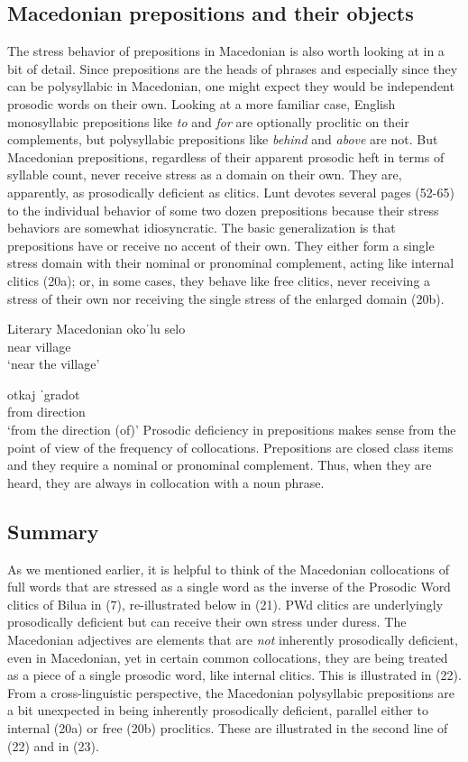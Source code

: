 \documentclass[output=paper,
modfonts
]{LSP/langsci}
\begin{document}
\subsection[Macedonian prepositions and their objects]{Macedonian prepositions and their objects}

The stress behavior of prepositions in Macedonian is also worth looking at in a bit of detail. Since prepositions are the heads of phrases and especially since they can be polysyllabic in Macedonian, one might expect they would be independent prosodic words on their own. Looking at a more familiar case, English monosyllabic prepositions like \textit{to} and\textit{ for} are optionally proclitic on their complements, but polysyllabic prepositions like \textit{behind} and \textit{above} are not. But Macedonian prepositions, regardless of their apparent prosodic heft in terms of syllable count, never receive stress as a domain on their own. They are, apparently, as prosodically deficient as clitics. Lunt devotes several pages (52-65) to the individual behavior of some two dozen prepositions because their stress behaviors are somewhat idiosyncratic. The basic generalization is that prepositions have or receive no accent of their own. They either form a single stress domain with their nominal or pronominal complement, acting like internal clitics (20a); or, in some cases, they behave like free clitics, never receiving a stress of their own nor receiving the single stress of the enlarged domain (20b). 

\ea Literary Macedonian \citep{franks1989}
	\ea \gll okoˈlu selo\\
	near village\\
	\glt  `near the village'

	\ex otkaj ˈgradot\\
	from direction\\
	\glt `from the direction (of)'
	\z
\z
Prosodic deficiency in prepositions makes sense from the point of view of the frequency of collocations. Prepositions are closed class items and they require a nominal or pronominal complement. Thus, when they are heard, they are always in collocation with a noun phrase.

\subsection[Summary]{Summary}

As we mentioned earlier, it is helpful to think of the Macedonian collocations of full words that are stressed as a single word as the inverse of the Prosodic Word clitics of Bilua in (7), re-illustrated below in (21). PWd clitics are underlyingly prosodically deficient but can receive their own stress under duress. The Macedonian adjectives are elements that are \textit{not} inherently prosodically deficient, even in Macedonian, yet in certain common collocations, they are being treated as a piece of a single prosodic word, like internal clitics. This is illustrated in (22). From a cross-linguistic perspective, the Macedonian polysyllabic prepositions are a bit unexpected in being inherently prosodically deficient, parallel either to internal (20a) or free (20b) proclitics. These are illustrated in the second line of (22) and in (23).
\end{document}

